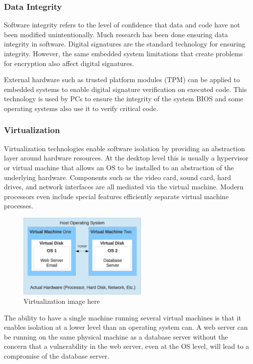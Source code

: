 \documentclass[final,conference,11pt]{IEEEtran}
\begin{document}
\subsubsection{Data Integrity}
Software integrity refers to the level of confidence that data and code have not been modified unintentionally.  Much research has been done ensuring data integrity in software.  Digital signatures are the standard technology for ensuring integrity. However, the same embedded system limitations that create problems for encryption also affect digital signatures.  

External hardware such as trusted platform modules (TPM) can be applied to embedded systems to enable digital signature verification on executed code.  This technology is used by PCs to ensure the integrity of the system BIOS and some operating systems also use it to verify critical code.  

\subsubsection{Virtualization}
Virtualization technologies enable software isolation by providing an abstraction layer around hardware resources.  At the desktop level this is usually a hypervisor or virtual machine that allows an OS to be installed to an abstraction of the underlying hardware.  Components such as the video card, sound card, hard drives, and network interfaces are all mediated via the virtual machine.  Modern processors even include special features efficiently separate virtual machine processes.

\begin{figure}[!t]
\centering
\includegraphics[width=2.5in]{virtual}
\caption{Virtualization image here}
\label{fig:monitor}
\end{figure}

The ability to have a single machine running several virtual machines is that it enables isolation at a lower level than an operating system can.  A web server can be running on the same physical machine as a database server without the concern that a vulnerability in the web server, even at the OS level, will lead to a compromise of the database server.
\end{document}
